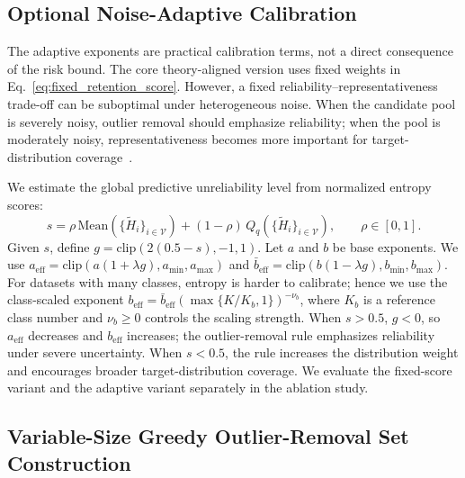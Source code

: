 ﻿\documentclass[conference]{IEEEtran}
\theoremstyle{definition}
\theoremstyle{remark}
\begin{document}
\subsection{Optional Noise-Adaptive Calibration}
\label{subsec:adaptive_calibration}

The adaptive exponents are practical calibration terms, not a direct consequence of the risk bound.
The core theory-aligned version uses fixed weights in Eq.~\eqref{eq:fixed_retention_score}.
However, a fixed reliability--representativeness trade-off can be suboptimal under heterogeneous noise.
When the candidate pool is severely noisy, outlier removal should emphasize reliability; when the pool is moderately noisy, representativeness becomes more important for target-distribution coverage~\cite{liang2023fednoisy,wu2023fednoro}.

We estimate the global predictive unreliability level from normalized entropy scores:
\begin{equation}
\label{eq:global_noise_score}
s
=
\rho\,\mathrm{Mean}(\{\widetilde H_i\}_{i\in\mathcal V})
+
(1-\rho)\,Q_q(\{\widetilde H_i\}_{i\in\mathcal V}),
\qquad
\rho\in[0,1].
\end{equation}
Given $s$, define $g=\mathrm{clip}(2(0.5-s),-1,1)$.
Let $a$ and $b$ be base exponents.
We use $a_{\mathrm{eff}}=\mathrm{clip}(a(1+\lambda g),a_{\min},a_{\max})$ and $\bar b_{\mathrm{eff}}=\mathrm{clip}(b(1-\lambda g),b_{\min},b_{\max})$.
For datasets with many classes, entropy is harder to calibrate; hence we use the class-scaled exponent $b_{\mathrm{eff}}=\bar b_{\mathrm{eff}}(\max\{K/K_b,1\})^{-\nu_b}$, where $K_b$ is a reference class number and $\nu_b\ge0$ controls the scaling strength.
When $s>0.5$, $g<0$, so $a_{\mathrm{eff}}$ decreases and $b_{\mathrm{eff}}$ increases; the outlier-removal rule emphasizes reliability under severe uncertainty.
When $s<0.5$, the rule increases the distribution weight and encourages broader target-distribution coverage.
We evaluate the fixed-score variant and the adaptive variant separately in the ablation study.

\subsection{Variable-Size Greedy Outlier-Removal Set Construction}
\label{subsec:variable_greedy}
\end{document}
